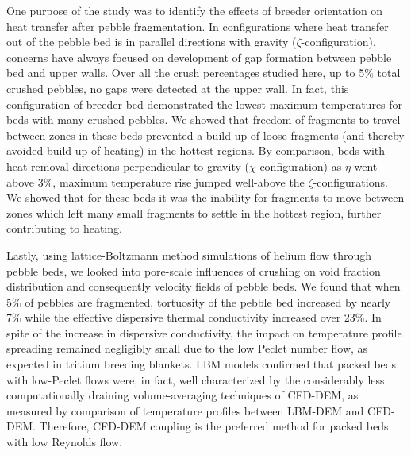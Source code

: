 One purpose of the study was to identify the effects of breeder orientation on heat transfer after pebble fragmentation. In configurations where heat transfer out of the pebble bed is in parallel directions with gravity ($\zeta$-configuration), concerns have always focused on development of gap formation between pebble bed and upper walls. Over all the crush percentages studied here, up to 5\% total crushed pebbles, no gaps were detected at the upper wall. In fact, this configuration of breeder bed demonstrated the lowest maximum temperatures for beds with many crushed pebbles. We showed that freedom of fragments to travel between zones in these beds prevented a build-up of loose fragments (and thereby avoided build-up of heating) in the hottest regions. By comparison, beds with heat removal directions perpendicular to gravity ($\chi$-configuration) as $\eta$ went above 3\%, maximum temperature rise jumped well-above the $\zeta$-configurations. We showed that for these beds it was the inability for fragments to move between zones which left many small fragments to settle in the hottest region, further contributing to heating.



Lastly, using lattice-Boltzmann method simulations of helium flow through pebble beds, we looked into pore-scale influences of crushing on void fraction distribution and consequently velocity fields of pebble beds. We found that when 5\% of pebbles are fragmented, tortuosity of the pebble bed increased by nearly 7\% while the effective dispersive thermal conductivity increased over 23\%. In spite of the increase in dispersive conductivity, the impact on temperature profile spreading remained negligibly small due to the low Peclet number flow, as expected in tritium breeding blankets. LBM models confirmed that packed beds with low-Peclet flows were, in fact, well characterized by the considerably less computationally draining volume-averaging techniques of CFD-DEM, as measured by comparison of temperature profiles between LBM-DEM and CFD-DEM. Therefore, CFD-DEM coupling is the preferred method for packed beds with low Reynolds flow.

